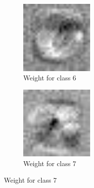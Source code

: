 \begin{figure}
    \begin{subfigure}
        \centering
        \includegraphics[width=0.4\textwidth]{figures/weights/class_6_weight_image.jpg}
        \caption{Weight for class 6}
        \label{fig:class_6_weight}
    \end{subfigure}
    \begin{subfigure}
        \centering
        \includegraphics[width=0.4\textwidth]{figures/weights/class_7_weight_image.jpg}
        \caption{Weight for class 7}
        \label{fig:class_7_weight}
    \end{subfigure}

    \newpage


\end{figure}
